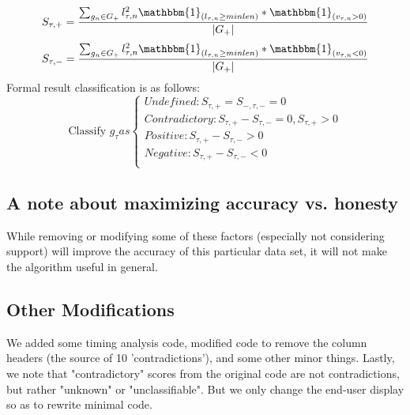 \documentclass[12pt, a4, epsf] {article}
\theoremstyle{plain}
\theoremstyle{definition}
\begin{document}
\begin{equation}
S_{\tau,+} = \frac{\sum_{g_n \in G_+}{l^2_{\tau,n}\mathbbm{1}_{(l_{\tau,n}\geq minlen)}*\mathbbm{1}_{(v_{\tau,n}>0)}}}{|G_+|}
\end{equation}
\begin{equation}
S_{\tau,-} = \frac{\sum_{g_n \in G_+}{l^2_{\tau,n}\mathbbm{1}_{(l_{\tau,n}\geq minlen)}*\mathbbm{1}_{(v_{\tau,n}<0)}}}{|G_+|}
\end{equation}
Formal result classification is as follows:\\
\begin{equation}
\text{Classify } g_{\tau} as 
    \begin{cases}
      Undefined: S_{\tau,+} = S_{-,\tau,-} = 0\\
      Contradictory: S_{\tau,+} - S_{\tau,-} = 0, S_{\tau,+} > 0\\
      Positive: S_{\tau,+} - S_{\tau,-} > 0\\
      Negative: S_{\tau,+} - S_{\tau,-} < 0 \\
    \end{cases}   
\end{equation}
\subsection*{A note about maximizing accuracy vs. honesty}
While removing or modifying some of these factors (especially not considering support) will improve the accuracy of this particular data set, it will not make the algorithm useful in general.
\subsection*{Other Modifications}
We added some timing analysis code, modified code to remove the column headers (the source of 10 'contradictions'), and some other minor things. Lastly, we note that "contradictory" scores from the original code are not contradictions, but rather "unknown" or "unclassifiable". But we only change the end-user display so as to rewrite minimal code. 
\end{document}
